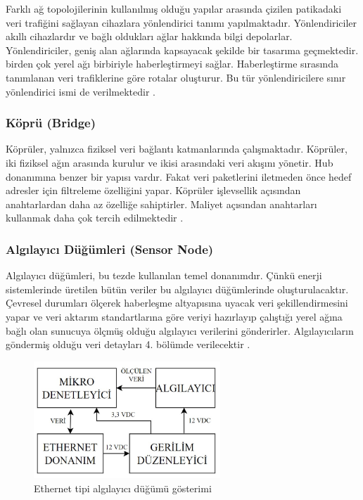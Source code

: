 Farklı ağ topolojilerinin kullanılmış olduğu yapılar arasında çizilen patikadaki veri trafiğini sağlayan cihazlara yönlendirici tanımı yapılmaktadır. Yönlendiriciler akıllı cihazlardır ve bağlı oldukları ağlar hakkında bilgi depolarlar. Yönlendiriciler, geniş alan ağlarında kapsayacak şekilde bir tasarıma geçmektedir. birden çok yerel ağı birbiriyle haberleştirmeyi sağlar. Haberleştirme sırasında tanımlanan veri trafiklerine göre rotalar oluşturur. Bu tür yönlendiricilere sınır yönlendirici ismi de verilmektedir  \cite{parziale_2006}.

\subsubsection{Köprü (Bridge)}


Köprüler, yalnızca fiziksel veri bağlantı katmanlarında çalışmaktadır. Köprüler, iki fiziksel ağın arasında kurulur ve ikisi arasındaki veri akışını yönetir. Hub donanımına benzer bir yapısı vardır. Fakat veri paketlerini iletmeden önce hedef adresler için filtreleme özelliğini yapar. Köprüler işlevsellik açısından anahtarlardan daha az özelliğe sahiptirler. Maliyet açısından anahtarları kullanmak daha çok tercih edilmektedir \cite{parziale_2006}.


\subsubsection{Algılayıcı Düğümleri (Sensor Node)}\label{algilayicidugum}

Algılayıcı düğümleri, bu tezde kullanılan temel donanımdır. Çünkü enerji sistemlerinde üretilen bütün veriler bu algılayıcı düğümlerinde oluşturulacaktır. Çevresel durumları ölçerek haberleşme altyapısına uyacak veri şekillendirmesini yapar ve veri aktarım standartlarına göre veriyi hazırlayıp çalıştığı yerel ağına bağlı olan sunucuya ölçmüş olduğu algılayıcı verilerini gönderirler. Algılayıcıların göndermiş olduğu veri detayları 4. bölümde verilecektir \cite{parziale_2006}.

\begin{figure}[htbp]
\centerline{\includegraphics[width=7cm]{Resim/sekil3-3.jpg}}
\caption{Ethernet tipi algılayıcı düğümü gösterimi}
\label{fig:figure9}
\end{figure}

